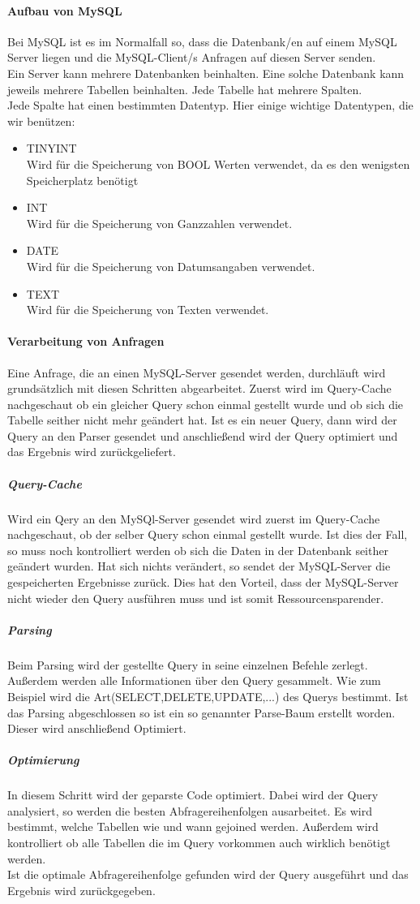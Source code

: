 \paragraph{Aufbau von MySQL}
Bei MySQL ist es im Normalfall so, dass die Datenbank/en auf einem MySQL Server liegen und die MySQL-Client/s Anfragen auf diesen Server senden.\\
Ein Server kann mehrere Datenbanken beinhalten. Eine solche Datenbank kann jeweils mehrere Tabellen beinhalten. Jede Tabelle hat mehrere Spalten.\\
Jede Spalte hat einen bestimmten Datentyp. Hier einige wichtige Datentypen, die wir benützen:
\begin{itemize}
	\item TINYINT\\
	Wird für die Speicherung von BOOL Werten verwendet, da es den wenigsten Speicherplatz benötigt
	\item INT\\
	Wird für die Speicherung von Ganzzahlen verwendet.
	\item DATE\\
	Wird für die Speicherung von Datumsangaben verwendet.
	\item TEXT\\
	Wird für die Speicherung von Texten verwendet.
\end{itemize}
\paragraph{Verarbeitung von Anfragen}
Eine Anfrage, die an einen MySQL-Server gesendet werden, durchläuft wird grundsätzlich mit diesen Schritten abgearbeitet. Zuerst wird im Query-Cache nachgeschaut ob ein gleicher Query schon einmal gestellt wurde und ob sich die Tabelle seither nicht mehr geändert hat. Ist es ein neuer Query, dann wird der Query an den Parser gesendet und anschließend wird der Query optimiert und das Ergebnis wird zurückgeliefert.
\subparagraph{Query-Cache}
Wird ein Qery an den MySQl-Server gesendet wird zuerst im Query-Cache nachgeschaut, ob der selber Query schon einmal gestellt wurde. Ist dies der Fall, so muss noch kontrolliert werden ob sich die Daten in der Datenbank seither geändert wurden. Hat sich nichts verändert, so sendet der MySQL-Server die gespeicherten Ergebnisse zurück. Dies hat den Vorteil, dass der MySQL-Server nicht wieder den Query ausführen muss und ist somit Ressourcensparender. 
\subparagraph{Parsing}
Beim Parsing wird der gestellte Query in seine einzelnen Befehle zerlegt. Außerdem werden alle Informationen über den Query gesammelt. Wie zum Beispiel wird die Art(SELECT,DELETE,UPDATE,...) des Querys bestimmt. Ist das Parsing abgeschlossen so ist ein so genannter Parse-Baum erstellt worden. Dieser wird anschließend Optimiert.
\subparagraph{Optimierung}
In diesem Schritt wird der geparste Code optimiert. Dabei wird der Query analysiert, so werden die besten Abfragereihenfolgen ausarbeitet. Es wird bestimmt, welche Tabellen wie und wann gejoined werden. Außerdem wird kontrolliert ob alle Tabellen die im Query vorkommen auch wirklich benötigt werden.\\
Ist die optimale Abfragereihenfolge gefunden wird der Query ausgeführt und das Ergebnis wird zurückgegeben.
